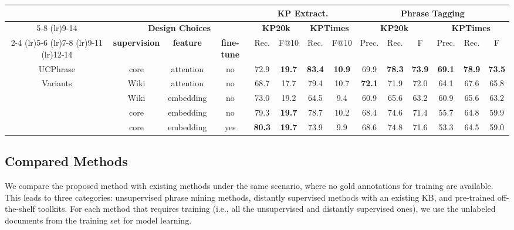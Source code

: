 \documentclass[sigconf]{acmart}
\newcommand{\our}{\mbox{UCPhrase}\xspace}
\newcommand{\ie}{\mbox{i.e.}\xspace}
\newcommand{\smtx}[1]{\scriptsize{#1}}
\begin{document}
\begin{table*}[]
    \renewcommand\arraystretch{.8}
    \centering
\caption{Ablation study of \our model variants ().}
    \label{tab:ablation}
    \small
    \begin{tabular}{cccc cccc cccccc}
    \toprule
    & & & & \multicolumn{4}{c}{\textbf{KP Extract.}} &  \multicolumn{6}{c}{\textbf{Phrase Tagging}}  \\
    \cmidrule(lr){5-8} \cmidrule(lr){9-14}
    & \multicolumn{3}{c}{\textbf{Design Choices}} & \multicolumn{2}{c}{\textbf{KP20k}} & \multicolumn{2}{c}{\textbf{KPTimes}} & \multicolumn{3}{c}{\textbf{KP20k}} & \multicolumn{3}{c}{\textbf{KPTimes}} \\
    \cmidrule(lr){2-4} \cmidrule(lr){5-6} \cmidrule(lr){7-8} \cmidrule(lr){9-11} \cmidrule(lr){12-14}
    & \textbf{supervision} & \textbf{feature} & \textbf{fine-tune} & Rec. & F\smtx{@10} & Rec. & F\smtx{@10} & Prec. & Rec. & F  & Prec. & Rec. & F \\
    \midrule
    \our & core & attention & no  & 72.9 & \textbf{19.7} & \textbf{83.4} & \textbf{10.9} & 69.9 & \textbf{78.3} & \textbf{73.9} & \textbf{69.1} & \textbf{78.9} & \textbf{73.5}  \\
    \midrule
    \multirow{4}{*}{Variants}& Wiki & attention & no & 68.7 & 17.7 & 79.4 & 10.7 & \textbf{72.1} & 71.9 & 72.0 & 64.1 & 67.6 & 65.8 \\
    & Wiki & embedding & no & 73.0 & 19.2 & 64.5 & 9.4 & 60.9 & 65.6 & 63.2 & 60.9 & 65.6 & 63.2 \\
    & core & embedding & no & 79.3 & \textbf{19.7} & 78.7 & 10.2 & 68.4 & 74.6 & 71.4 & 55.7 & 64.8 & 59.9 \\
    & core & embedding & yes & \textbf{80.3} & \textbf{19.7} & 73.9 & 9.9 & 68.6 & 74.8 & 71.6 & 53.3 & 64.5 & 59.0 \\
\bottomrule
    \end{tabular}
    \vspace{-3mm}
\end{table*}

 



\subsection{Compared Methods}
\label{sec:compared-methods}
We compare the proposed method with existing methods under the same scenario, where no gold annotations for training are available.
This leads to three categories: unsupervised phrase mining methods, distantly supervised methods with an existing KB, and pre-trained off-the-shelf toolkits.
For each method that requires training (\ie, all the unsupervised and distantly supervised ones), we use the unlabeled documents from the training set for model learning.
\end{document}

